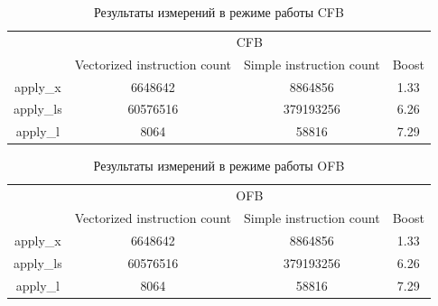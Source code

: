 \documentclass[a4paper, 12pt]{article}
\begin{document}
    \begin{table}[]
    \begin{center}
    \begin{tabular}{|c|ccc|}
    \hline
    \multirow{2}{*}{} & \multicolumn{3}{c|}{CFB}                                                                                  \\ \cline{2-4} 
                      & \multicolumn{1}{c|}{Vectorized instruction count} & \multicolumn{1}{c|}{Simple instruction count} & Boost \\ \hline
    apply\_x          & \multicolumn{1}{c|}{6648642}                      & \multicolumn{1}{c|}{8864856}                  & 1.33  \\ \hline
    apply\_ls         & \multicolumn{1}{c|}{60576516}                     & \multicolumn{1}{c|}{379193256}                & 6.26  \\ \hline
    apply\_l          & \multicolumn{1}{c|}{8064}                         & \multicolumn{1}{c|}{58816}                    & 7.29  \\ \hline
    \end{tabular}
    \end{center}
    \caption{Результаты измерений в режиме работы CFB}
    \label{tab:result_CFB}
    \end{table}

    \begin{table}[]
    \begin{center}
    \begin{tabular}{|c|ccc|}
    \hline
    \multirow{2}{*}{} & \multicolumn{3}{c|}{OFB}                                                                                  \\ \cline{2-4} 
                      & \multicolumn{1}{c|}{Vectorized instruction count} & \multicolumn{1}{c|}{Simple instruction count} & Boost \\ \hline
    apply\_x          & \multicolumn{1}{c|}{6648642}                      & \multicolumn{1}{c|}{8864856}                  & 1.33  \\ \hline
    apply\_ls         & \multicolumn{1}{c|}{60576516}                     & \multicolumn{1}{c|}{379193256}                & 6.26  \\ \hline
    apply\_l          & \multicolumn{1}{c|}{8064}                         & \multicolumn{1}{c|}{58816}                    & 7.29  \\ \hline
    \end{tabular}
    \end{center}
    \caption{Результаты измерений в режиме работы OFB}
    \label{tab:result_OFB}
    \end{table}
\end{document}
